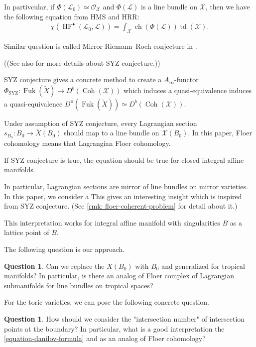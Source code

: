 \documentclass[a4paper,dvipdfmx,reqno,12pt]{amsart}
\theoremstyle{definition}
\newtheorem{question}[theorem]{Question}
\newcommand{\mcal}[1]{\mathcal{#1}}%
\newcommand{\opn}[1]{\operatorname{#1}}
\numberwithin{equation}{section}
\begin{document}
In partivcular, if $\Phi(\mathscr{L}_0)
  \simeq \mcal{O}_{\mathcal{X}}$ and 
$\Phi(\mathscr{L})$ is a line bundle on $\mathcal{X}$,
then we have the following equation 
from HMS and HRR:
\begin{align}
\label{equation-MRR}
\chi (\opn{HF}^{\bullet}(\mathscr{L}_0,\mathscr{L}))=
\int_{\mathcal{X}}\opn{ch}(\Phi(\mathscr{L}))
\opn{td}(\mathcal{X}).
\end{align}

Similar question is called 
Mirror Riemann--Roch conjecture in 
\cite[Conjecture 4.9]{grossSpecialLagrangianFibrations1998a}.

((See also 
\cite[.2,
.7]{MR2567952} for more details about 
SYZ conjecture.))

SYZ conjecture gives a concrete method to create 
a $A_{\infty}$-functor 
$\Phi_{\mathrm{SYZ}}\colon 
\opn{Fuk}(\check{X})\to D^{b}(\opn{Coh}(
\mathcal{X}))$
which induces a quasi-equivalence
induces a quasi-equivalence 
$D^{\pi}(\opn{Fuk}(\check{X}))\simeq 
D^{b}(\opn{Coh}(\mathcal{X}))$.

Under assumption of SYZ conjecture, 
every Lagrangian section 
$s_{B_0}\colon B_0\to \check{X}(B_0)$ 
should map to a line bundle on 
$\mathcal{X}(B_0)$. 
In this paper, Floer cohomology means that 
Lagrangian Floer cohomology.


If SYZ conjecture is true, the equation should be
true for closed integral affine manifolds.


In particular, Lagrangian sections are mirror of line bundles on
mirror varieties. 
In this paper, we consider a 
This gives an interesting insight which is inspired from
SYZ conjecture.
(See \cref{rmk: floer-coherent-problem} 
for detail about it.)

This interpretation works for integral affine manifold 
with singularities $B$ as a lattice point of $B$. 






The following question is our approach.
\begin{question}
\label{question-MRR}
Can we replace the $X(B_0)$ with $B_0$ and generalized 
for tropical manifolds?
In particular, is there an analog of Floer complex of
Lagrangian submanifolds for line bundles on 
tropical spaces?  
\end{question}

For the toric varieties, we can pose the following 
concrete question.

\begin{question}
How should we consider the "intersection number" 
of intersection points at the boundary? In particular,
what is a good interpretation the 
\cref{equation-danilov-formula} and 
as an analog of Floer cohomology?
\end{question}
\end{document}
